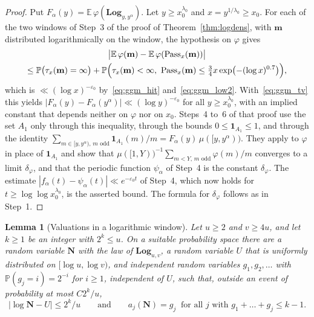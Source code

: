 \documentclass[12pt]{amsart}
\newtheorem{lemma}{Lemma}
\theoremstyle{definition}
\theoremstyle{remark}
\begin{document}
\begin{proof}
Put $F_\alpha(y)=\mathbb E\,\varphi(\mathbf{Log}_{y,y^\alpha})$. Let $y\ge x_0^{\lambda_0}$ and $x=y^{1/\lambda_0}\ge x_0$. For each of the two windows of Step~3 of the proof of Theorem~\ref{thm:logdens}, with $\mathbf m$ distributed logarithmically on the window, the hypothesis on $\varphi$ gives
\begin{multline*}
\bigl|\mathbb E\,\varphi(\mathbf m)-\mathbb E\,\varphi(\operatorname{Pass}_x(\mathbf m))\bigr|\\
\le\mathbb P\bigl(\tau_x(\mathbf m)=\infty\bigr)+\mathbb P\Bigl(\tau_x(\mathbf m)<\infty,\ \operatorname{Pass}_x(\mathbf m)\le\tfrac34x\exp\bigl(-(\log x)^{0.7}\bigr)\Bigr),
\end{multline*}
which is $\ll(\log x)^{-\varepsilon_0}$ by~\eqref{eq:ggm_hit} and~\eqref{eq:ggm_low2}. With~\eqref{eq:ggm_tv} this yields $|F_\alpha(y)-F_\alpha(y^\alpha)|\ll(\log y)^{-\varepsilon_0}$ for all $y\ge x_0^{\lambda_0}$, with an implied constant that depends neither on $\varphi$ nor on $x_0$. Steps~4 to~6 of that proof use the set $A_1$ only through this inequality, through the bounds $0\le\mathbf 1_{A_1}\le1$, and through the identity $\sum_{m\in[y,y^\alpha),\,m\text{ odd}}\mathbf 1_{A_1}(m)/m=F_\alpha(y)\,\mu([y,y^\alpha))$. They apply to $\varphi$ in place of $\mathbf 1_{A_1}$ and show that $\mu([1,Y))^{-1}\sum_{m<Y,\,m\text{ odd}}\varphi(m)/m$ converges to a limit $\delta_\varphi$, and that the periodic function $\psi_\alpha$ of Step~4 is the constant $\delta_\varphi$. The estimate $|f_\alpha(t)-\psi_\alpha(t)|\ll e^{-\varepsilon_0t}$ of Step~4, which now holds for $t\ge\log\log x_0^{\lambda_0}$, is the asserted bound. The formula for $\delta_\varphi$ follows as in Step~1.
\end{proof}

\begin{lemma}[Valuations in a logarithmic window]
\label{lem:valuations}
Let $u\ge2$ and $v\ge4u$, and let $k\ge1$ be an integer with $2^k\le u$. On a suitable probability space there are a random variable $\mathbf N$ with the law of $\mathbf{Log}_{u,v}$, a random variable $U$ that is uniformly distributed on $[\log u,\log v)$, and independent random variables $g_1,g_2,\ldots$ with $\mathbb P(g_j=i)=2^{-i}$ for $i\ge1$, independent of $U$, such that, outside an event of probability at most $C2^k/u$,
\[
|\log\mathbf N-U|\le2^k/u\qquad\text{and}\qquad a_j(\mathbf N)=g_j\ \text{ for all $j$ with }g_1+\dots+g_j\le k-1 .
\]
\end{lemma}
\end{document}
